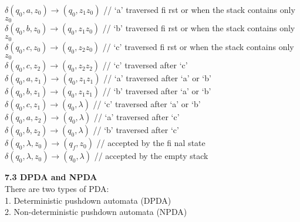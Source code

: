 \documentclass{article}
\begin{document}
	\begin{flushleft}
		\hspace{2cm}$\delta$$(q_0,a,z_0)\xrightarrow{}(q_0,z_1z_0)$ // ‘a’ traversed fi rst or when the stack contains only $z_0$\\
		\hspace{2cm}$\delta$$(q_0,b,z_0)\xrightarrow{}(q_0,z_1z_0)$ // ‘b’ traversed fi rst or when the stack contains only $z_0$\\
		\hspace{2cm}$\delta$$(q_0,c,z_0)\xrightarrow{}(q_0,z_2z_0)$ // ‘c’ traversed fi rst or when the stack contains only $z_0$\\
		\hspace{2cm}$\delta$$(q_0,c,z_2)\xrightarrow{}(q_0,z_2z_2)$ // ‘c’ traversed after ‘c’\\
		\hspace{2cm}$\delta$$(q_0,a,z_1)\xrightarrow{}(q_0,z_1z_1)$ // ‘a’ traversed after ‘a’ or ‘b’\\
		\hspace{2cm}$\delta$$(q_0,b,z_1)\xrightarrow{}(q_0,z_1z_1)$ // ‘b’ traversed after ‘a’ or ‘b’\\
		\hspace{2cm}$\delta$$(q_0,c,z_1)\xrightarrow{}(q_0,\lambda)$ \hspace{5mm}// ‘c’ traversed after ‘a’ or ‘b’\\
		\hspace{2cm}$\delta$$(q_0,a,z_2)\xrightarrow{}(q_0,\lambda)$ \hspace{5mm}// ‘a’ traversed after ‘c’\\
		\hspace{2cm}$\delta$$(q_0,b,z_2)\xrightarrow{}(q_0,\lambda)$ \hspace{5mm}// ‘b’ traversed after ‘c’\\
		\hspace{2cm}$\delta$$(q_0,\lambda,z_0)\xrightarrow{}(q_f,z_0)$ \hspace{2mm}// accepted by the fi nal state\\
		\hspace{2cm}$\delta$$(q_0,\lambda,z_0)\xrightarrow{}(q_0,\lambda)$ \hspace{3mm}// accepted by the empty stack\\
	\end{flushleft}
\begin{flushleft}
	\textbf{7.3 DPDA and NPDA}\\
	There are two types of PDA:\\
	\hspace{5mm}1. Deterministic pushdown automata (DPDA)\\
	\hspace{5mm}2. Non-deterministic pushdown automata (NPDA)\\
\end{flushleft}
\end{document}
